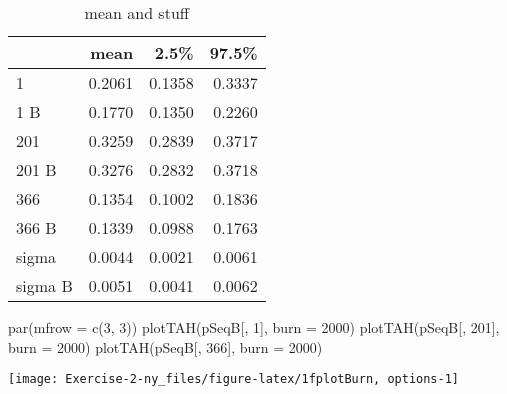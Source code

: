 \documentclass[
]{article}
\newenvironment{Shaded}{\begin{snugshade}}{\end{snugshade}}
\newcommand{\AttributeTok}[1]{\textcolor[rgb]{0.77,0.63,0.00}{#1}}
\newcommand{\DecValTok}[1]{\textcolor[rgb]{0.00,0.00,0.81}{#1}}
\newcommand{\FunctionTok}[1]{\textcolor[rgb]{0.00,0.00,0.00}{#1}}
\newcommand{\NormalTok}[1]{#1}
\begin{document}
\begin{table}

\caption{\label{tab:1fburn}mean and stuff}
\centering
\begin{tabular}[t]{l|r|r|r}
\hline
  & mean & 2.5\% & 97.5\%\\
\hline
1 & 0.2061 & 0.1358 & 0.3337\\
\hline
1 B & 0.1770 & 0.1350 & 0.2260\\
\hline
201 & 0.3259 & 0.2839 & 0.3717\\
\hline
201 B & 0.3276 & 0.2832 & 0.3718\\
\hline
366 & 0.1354 & 0.1002 & 0.1836\\
\hline
366 B & 0.1339 & 0.0988 & 0.1763\\
\hline
sigma & 0.0044 & 0.0021 & 0.0061\\
\hline
sigma B & 0.0051 & 0.0041 & 0.0062\\
\hline
\end{tabular}
\end{table}

\begin{Shaded}
\begin{Highlighting}[]
\FunctionTok{par}\NormalTok{(}\AttributeTok{mfrow =} \FunctionTok{c}\NormalTok{(}\DecValTok{3}\NormalTok{, }\DecValTok{3}\NormalTok{))}
\FunctionTok{plotTAH}\NormalTok{(pSeqB[, }\DecValTok{1}\NormalTok{], }\AttributeTok{burn =} \DecValTok{2000}\NormalTok{)}
\FunctionTok{plotTAH}\NormalTok{(pSeqB[, }\DecValTok{201}\NormalTok{], }\AttributeTok{burn =} \DecValTok{2000}\NormalTok{)}
\FunctionTok{plotTAH}\NormalTok{(pSeqB[, }\DecValTok{366}\NormalTok{], }\AttributeTok{burn =} \DecValTok{2000}\NormalTok{)}
\end{Highlighting}
\end{Shaded}

\begin{center}\texttt{[image: Exercise-2-ny\_files/figure-latex/1fplotBurn, options-1]} \end{center}
\end{document}
